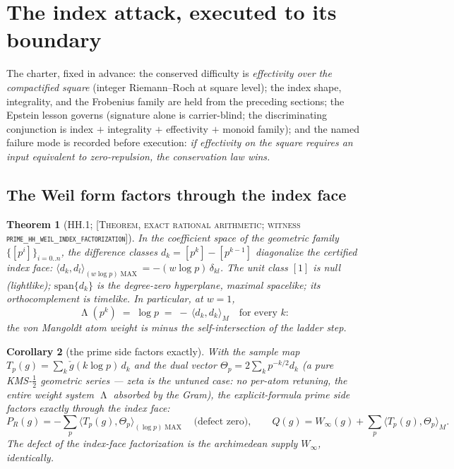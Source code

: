 \documentclass[11pt,reqno]{amsart}
\theoremstyle{plain}
\newtheorem{theorem}{Theorem}[section]
\newtheorem{corollary}[theorem]{Corollary}
\theoremstyle{definition}
\theoremstyle{remark}
\newcommand{\grade}[1]{\textup{[\textsc{#1}]}}
\DeclareMathOperator{\Lam}{\Lambda}
\DeclareMathOperator{\MAX}{MAX}
\begin{document}
\section{The index attack, executed to its boundary}\label{sec:index}

The charter, fixed in advance: the conserved difficulty is \emph{effectivity over the
compactified square} (integer Riemann--Roch at square level); the index shape, integrality,
and the Frobenius family are held from the preceding sections; the Epstein lesson governs
(signature alone is carrier-blind; the discriminating conjunction is index $+$ integrality
$+$ effectivity $+$ monoid family); and the named failure mode is recorded before execution:
\emph{if effectivity on the square requires an input equivalent to zero-repulsion, the
conservation law wins.}

\subsection{The Weil form factors through the index face}\label{subsec:hh}

\begin{theorem}[HH.1; \grade{Theorem, exact rational arithmetic; witness
\texttt{prime\_\allowbreak hh\_\allowbreak weil\_\allowbreak index\_\allowbreak factorization}}]\label{thm:hh1}
In the coefficient space of the geometric family $\{[p^i]\}_{i = 0..n}$, the difference
classes $d_k = [p^k] - [p^{k-1}]$ diagonalize the certified index face:
$\langle d_k, d_l\rangle_{(w\log p)\MAX} = -(w \log p)\,\delta_{kl}$. The unit class $[1]$
is null (lightlike); $\mathrm{span}\{d_k\}$ is the degree-zero hyperplane, maximal spacelike;
its orthocomplement is timelike. In particular, at $w = 1$,
\[
\Lam(p^k) \;=\; \log p \;=\; -\,\langle d_k, d_k\rangle_M \quad \text{for every } k:
\]
the von Mangoldt atom weight is minus the self-intersection of the ladder step.
\end{theorem}

\begin{corollary}[the prime side factors exactly]\label{cor:primeside}
With the sample map $T_p(g) = \sum_k \check g(k \log p)\, d_k$ and the dual vector
$\Theta_p = 2\sum_k p^{-k/2} d_k$ (a pure KMS-$\tfrac12$ geometric series --- zeta is the
\emph{untuned} case: no per-atom retuning, the entire weight system $\Lam$ absorbed by the
Gram), the explicit-formula prime side factors exactly through the index face:
\[
P_R(g) = -\sum_p \bigl\langle T_p(g), \Theta_p\bigr\rangle_{(\log p)\MAX}
\quad \text{(defect zero)}, \qquad
Q(g) = W_\infty(g) + \sum_p \bigl\langle T_p(g), \Theta_p\bigr\rangle_M .
\]
The defect of
the index-face factorization is the archimedean supply $W_\infty$, \emph{identically}.
\end{corollary}
\end{document}
